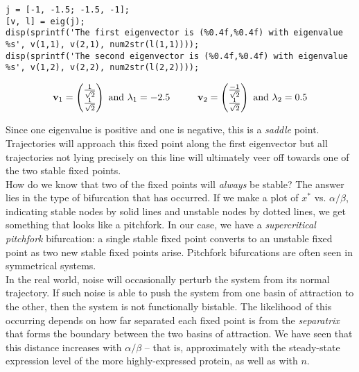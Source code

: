 \documentclass{article}
\begin{document}
\begin{lstlisting}
j = [-1, -1.5; -1.5, -1];
[v, l] = eig(j);
disp(sprintf('The first eigenvector is (%0.4f,%0.4f) with eigenvalue %s', v(1,1), v(2,1), num2str(l(1,1))));
disp(sprintf('The second eigenvector is (%0.4f,%0.4f) with eigenvalue %s', v(1,2), v(2,2), num2str(l(2,2))));
\end{lstlisting}

\[ \mathbf{v}_1 = \begin{pmatrix} \frac{1}{\sqrt{2}}\\ \frac{1}{\sqrt{2}} \end{pmatrix} \textrm{ and } \lambda_1 = -2.5 \hspace{1 cm} \mathbf{v}_2 = \begin{pmatrix} \frac{-1}{\sqrt{2}}\\ \frac{1}{\sqrt{2}} \end{pmatrix} \textrm{ and } \lambda_2 = 0.5 \]

Since one eigenvalue is positive and one is negative, this is a \textit{saddle} point. Trajectories will approach this fixed point along the first eigenvector but all trajectories not lying precisely on this line will ultimately veer off towards one of the two stable fixed points.\\

How do we know that two of the fixed points will \textit{always} be stable? The answer lies in the type of bifurcation that has occurred. If we make a plot of $x^*$ vs. $\alpha/\beta$, indicating stable nodes by solid lines and unstable nodes by dotted lines, we get something that looks like a pitchfork. In our case, we have a \textit{supercritical pitchfork} bifurcation: a single stable fixed point converts to an unstable fixed point as two new stable fixed points arise. Pitchfork bifurcations are often seen in symmetrical systems.\\

In the real world, noise will occasionally perturb the system from its normal trajectory. If such noise is able to push the system from one basin of attraction to the other, then the system is not functionally bistable. The likelihood of this occurring depends on how far separated each fixed point is from the \textit{separatrix} that forms the boundary between the two basins of attraction. We have seen that this distance increases with $\alpha/\beta$ -- that is, approximately with the steady-state expression level of the more highly-expressed protein, as well as with $n$.
\end{document}
